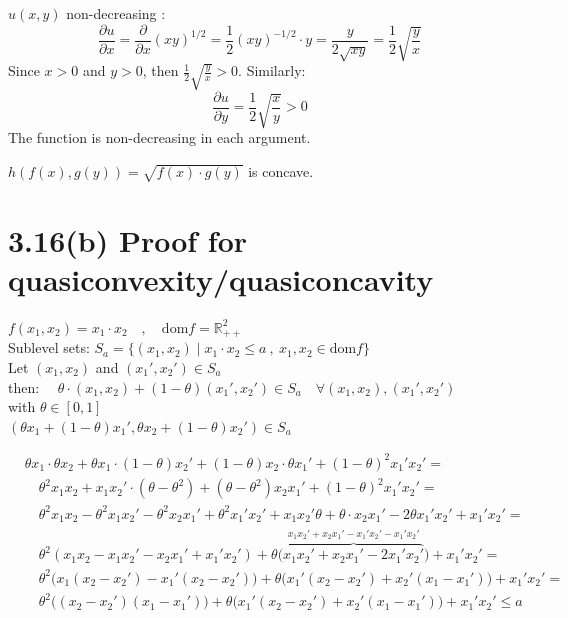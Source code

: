 \documentclass{article}
\begin{document}
\noindent $u(x,y)$ non-decreasing : 
$$ \frac{\partial u}{\partial x} = \frac{\partial}{\partial x} (xy)^{1/2} = \frac{1}{2}(xy)^{-1/2} \cdot y = \frac{y}{2\sqrt{xy}} = \frac{1}{2} \sqrt{\frac{y}{x}} $$\noindent Since $x > 0$ and $y > 0$, then $\frac{1}{2} \sqrt{\frac{y}{x}} > 0$. 
\noindent Similarly:$$ \frac{\partial u}{\partial y} = \frac{1}{2} \sqrt{\frac{x}{y}} > 0 $$\noindent  The function is non-decreasing in each argument.


\noindent $h(f(x), g(y)) = \sqrt{f(x) \cdot g(y)}$ \quad is concave.


\newpage

\section*{3.16(b) Proof for quasiconvexity/quasiconcavity}
\label{sec:qproof}

\noindent $f(x_1, x_2) = x_1 \cdot x_2 \quad , \quad \text{dom}f = \mathbb{R}_{++}^2$ \\[1em]
\noindent Sublevel sets: $S_a = \{ (x_1, x_2) \mid x_1 \cdot x_2 \leq a \ , \ x_1, x_2 \in \text{dom}f \}$ \\[1em]
\noindent Let $(x_1, x_2)$ and $(x_1', x_2') \in S_a$ \\[0.5em]
\indent then: $\quad \theta \cdot (x_1, x_2) + (1-\theta)(x_1', x_2') \in S_a \quad \forall (x_1, x_2), (x_1', x_2')$ \\
\indent with $\theta \in [0,1]$ \\[0.5em]
\indent $(\theta x_1 + (1-\theta)x_1', \theta x_2 + (1-\theta)x_2') \in S_a$

\vspace{1em}

\begin{align*}
&\theta x_1 \cdot \theta x_2 + \theta x_1 \cdot (1-\theta)x_2' + (1-\theta)x_2 \cdot \theta x_1' + (1-\theta)^2 x_1' x_2' = \\[0.5em]
&\quad \theta^2 x_1 x_2 + x_1 x_2' \cdot (\theta - \theta^2) + (\theta - \theta^2)x_2 x_1' + (1-\theta)^2 x_1' x_2' = \\[0.5em]
&\quad \theta^2 x_1 x_2 - \theta^2 x_1 x_2' - \theta^2 x_2 x_1' + \theta^2 x_1' x_2' + x_1 x_2' \theta + \theta \cdot x_2 x_1' - 2\theta x_1' x_2' + x_1' x_2' = \\[0.5em]
&\quad \theta^2 (x_1 x_2 - x_1 x_2' - x_2 x_1' + x_1' x_2') + \theta \Big( \overbrace{x_1 x_2' + x_2 x_1' - 2x_1' x_2'}^{x_1 x_2' + x_2 x_1' - x_1' x_2' - x_1' x_2'} \Big) + x_1' x_2' = \\[0.5em]
&\quad \theta^2 \Big( x_1(x_2 - x_2') - x_1'(x_2 - x_2') \Big) + \theta \Big( x_1'(x_2 - x_2') + x_2'(x_1 - x_1') \Big) + x_1' x_2' = \\[0.5em]
&\quad \theta^2 \Big( (x_2 - x_2')(x_1 - x_1') \Big) + \theta \Big( x_1'(x_2 - x_2') + x_2'(x_1 - x_1') \Big) + x_1' x_2' \leq a
\end{align*}
\end{document}
